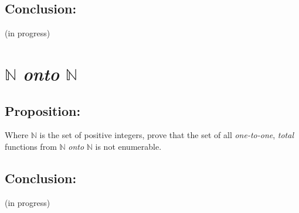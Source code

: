 \documentclass[a4paper,11pt]{article}
\begin{document}
	\bigskip
	
	\subsection*{Conclusion:}
	(in progress)


\section{$\mathbb{N}$ \textit{onto} $\mathbb{N}$}

	\subsection*{Proposition:}
	Where $\mathbb{N}$ is the set of positive integers, prove that the set of all \textit{one-to-one}, \textit{total}
	functions from $\mathbb{N}$ \textit{onto} $\mathbb{N}$ is not enumerable.
	
	\bigskip
	
	\subsection*{Conclusion:}	
	(in progress)
\end{document}
